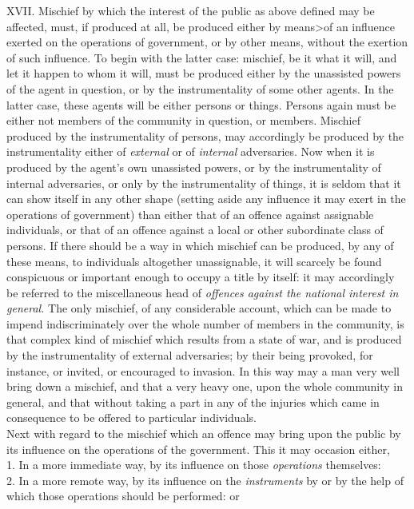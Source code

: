 \documentclass[12pt]{report}
\begin{document}
XVII. Mischief by which the interest of the public as above defined may
be affected, must, if produced at all, be produced either by
means\textgreater{}of an influence exerted on the operations of
government, or by other means, without the exertion of such influence.
To begin with the latter case: mischief, be it what it will, and let it
happen to whom it will, must be produced either by the unassisted powers
of the agent in question, or by the instrumentality of some other
agents. In the latter case, these agents will be either persons or
things. Persons again must be either not members of the community in
question, or members. Mischief produced by the instrumentality of
persons, may accordingly be produced by the instrumentality either of
\emph{external} or of \emph{internal} adversaries. Now when it is
produced by the agent's own unassisted powers, or by the instrumentality
of internal adversaries, or only by the instrumentality of things, it is
seldom that it can show itself in any other shape (setting aside any
influence it may exert in the operations of government) than either that
of an offence against assignable individuals, or that of an offence
against a local or other subordinate class of persons. If there should
be a way in which mischief can be produced, by any of these means, to
individuals altogether unassignable, it will scarcely be found
conspicuous or important enough to occupy a title by itself: it may
accordingly be referred to the miscellaneous head of \emph{offences
against the national interest in general.} The only mischief, of any
considerable account, which can be made to impend indiscriminately over
the whole number of members in the community, is that complex kind of
mischief which results from a state of war, and is produced by the
instrumentality of external adversaries; by their being provoked, for
instance, or invited, or encouraged to invasion. In this way may a man
very well bring down a mischief, and that a very heavy one, upon the
whole community in general, and that without taking a part in any of the
injuries which came in consequence to be offered to particular
individuals.\\
Next with regard to the mischief which an offence may bring upon the
public by its influence on the operations of the government. This it may
occasion either,\\
1. In a more immediate way, by its influence on those \emph{operations}
themselves:\\
2. In a more remote way, by its influence on the \emph{instruments} by
or by the help of which those operations should be performed: or\\
\end{document}
